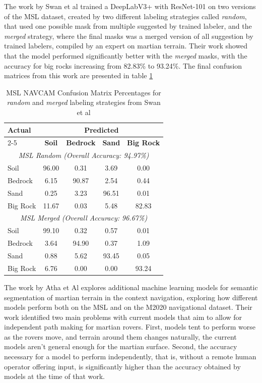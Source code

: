 \documentclass[10pt, conference]{IEEEtran}
\begin{document}
The work by Swan et al \cite{Swan2021} trained a DeepLabV3+ with ResNet-101 on two versions of the
MSL dataset, created by two  different labeling strategies called \textit{random}, that used one possible
mask from multiple suggested by trained labeler, and the \textit{merged} strategy, where the final
masks was a merged version of all suggestion by trained labelers, compiled by an expert on martian
terrain. Their work showed that the model performed significantly better with the \textit{merged}
masks, with the accuracy for big rocks increasing from 82.83\% to 93.24\%. The final confusion
matrices from this work are presented in table \ref{tab:Swan2021_results}

\begin{table}[h]
  \centering
  \label{tab:msl_confusion_matrices}
  \begin{tabular}{|l|c|c|c|c|}
    \hline
    \textbf{Actual} & \multicolumn{4}{c|}{\textbf{Predicted}} \\ \cline{2-5} 
                    & \textbf{Soil} & \textbf{Bedrock} & \textbf{Sand} & \textbf{Big Rock} \\ \hline
    \hline
    \multicolumn{5}{|c|}{\textit{MSL Random (Overall Accuracy: 94.97\%)}} \\ \hline
    Soil     & 96.00 & 0.31  & 3.69  & 0.00  \\ \hline
    Bedrock  & 6.15  & 90.87 & 2.54  & 0.44  \\ \hline
    Sand     & 0.25  & 3.23  & 96.51 & 0.01  \\ \hline
    Big Rock & 11.67 & 0.03  & 5.48  & 82.83 \\ \hline
    \hline
    \multicolumn{5}{|c|}{\textit{MSL Merged (Overall Accuracy: 96.67\%)}} \\ \hline
    Soil     & 99.10 & 0.32  & 0.57  & 0.01  \\ \hline
    Bedrock  & 3.64  & 94.90 & 0.37  & 1.09  \\ \hline
    Sand     & 0.88  & 5.62  & 93.45 & 0.05  \\ \hline
    Big Rock & 6.76  & 0.00  & 0.00  & 93.24 \\ \hline
  \end{tabular}
  \caption{MSL NAVCAM Confusion Matrix Percentages for \textit{random} and \textit{merged}
  labeling strategies from Swan et al \cite{Swan2021}}
  \label{tab:Swan2021_results}
\end{table}

The work by Atha et Al \cite{Atha2022} explores additional machine learning models for
semantic segmentation of martian terrain in the context navigation, exploring how
different models perform both on the MSL and on the M2020 navigational dataset. Their work
identified two main problems with current models that aim to allow for independent path
making for martian rovers. First, models tent to perform worse as the rovers move, and terrain
around them changes naturally, the current models aren't general enough for the martian surface.
Second, the accuracy necessary for a model to perform independently, that is, without a remote human
operator offering input, is significantly higher than the accuracy obtained by models at the time of
that work.
\end{document}

